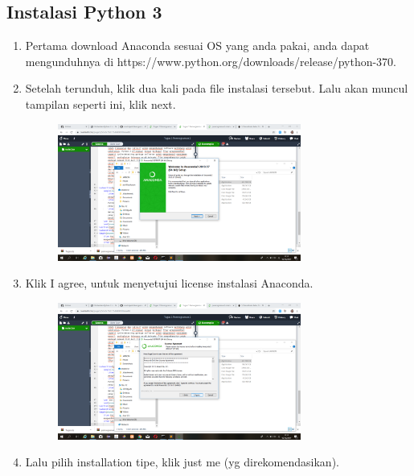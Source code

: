 \documentclass{article}
\begin{document}
\subsection{Instalasi Python 3}
\begin{enumerate}
    \item Pertama download Anaconda sesuai OS yang anda pakai, anda dapat mengunduhnya di https://www.python.org/downloads/release/python-370.
    \item Setelah terunduh, klik dua kali pada file instalasi tersebut. Lalu akan muncul tampilan seperti ini, klik next.
        \begin{figure}[h]
            \centerline{\includegraphics[width=8cm]{image/1.png}}
        \end{figure}
    \item Klik I agree, untuk menyetujui license instalasi Anaconda.
        \begin{figure}[h]
            \centerline{\includegraphics[width=8cm]{image/2.png}}
        \end{figure}
   \newpage
   \item Lalu pilih installation tipe, klik just me (yg direkomendasikan).

\end{enumerate}
\end{document}
